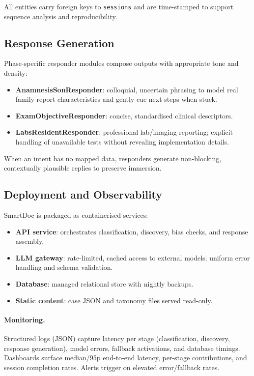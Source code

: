 All entities carry foreign keys to \texttt{sessions} and are time-stamped to
support sequence analysis and reproducibility.

\subsection{Response Generation}
\label{sec:response_generation}

Phase-specific responder modules compose outputs with appropriate tone and density:
\begin{itemize}
  \item \textbf{AnamnesisSonResponder}: colloquial, uncertain phrasing to model
        real family-report characteristics and gently cue next steps when stuck.
  \item \textbf{ExamObjectiveResponder}: concise, standardised clinical descriptors.
  \item \textbf{LabsResidentResponder}: professional lab/imaging reporting; explicit
        handling of unavailable tests without revealing implementation details.
\end{itemize}
When an intent has no mapped data, responders generate non-blocking, contextually
plausible replies to preserve immersion.

\subsection{Deployment and Observability}
\label{sec:deployment}

SmartDoc is packaged as containerised services:
\begin{itemize}
  \item \textbf{API service}: orchestrates classification, discovery, bias checks,
        and response assembly.
  \item \textbf{LLM gateway}: rate-limited, cached access to external models;
        uniform error handling and schema validation.
  \item \textbf{Database}: managed relational store with nightly backups.
  \item \textbf{Static content}: case JSON and taxonomy files served read-only.
\end{itemize}

\paragraph{Monitoring.}
Structured logs (JSON) capture latency per stage (classification, discovery,
response generation), model errors, fallback activations, and database timings.
Dashboards surface median/95p end-to-end latency, per-stage contributions, and
session completion rates. Alerts trigger on elevated error/fallback rates.

